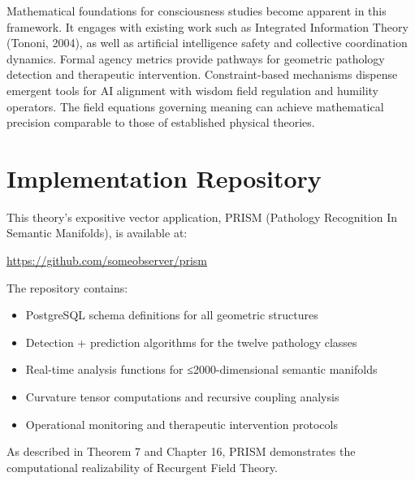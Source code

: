 \documentclass[11pt, a4paper]{report}
\begin{document}
Mathematical foundations for consciousness studies become apparent in this framework. It engages with existing work such as Integrated Information Theory (Tononi, 2004), as well as artificial intelligence safety and collective coordination dynamics. Formal agency metrics provide pathways for geometric pathology detection and therapeutic intervention. Constraint-based mechanisms dispense emergent tools for AI alignment with wisdom field regulation and humility operators. The field equations governing meaning can achieve mathematical precision comparable to those of established physical theories.

\tableofcontents

















\appendix
\chapter{Implementation Repository}
\label{appendix:implementation}

This theory's expositive vector application, PRISM (Pathology Recognition In Semantic Manifolds), is available at:

\begin{center}
\url{https://github.com/someobserver/prism}
\end{center}

The repository contains:
\begin{itemize}
\item PostgreSQL schema definitions for all geometric structures
\item Detection + prediction algorithms for the twelve pathology classes
\item Real-time analysis functions for ≤2000-dimensional semantic manifolds
\item Curvature tensor computations and recursive coupling analysis
\item Operational monitoring and therapeutic intervention protocols
\end{itemize}

As described in Theorem 7 and Chapter 16, PRISM demonstrates the computational realizability of Recurgent Field Theory.

\printbibliography
\end{document}
